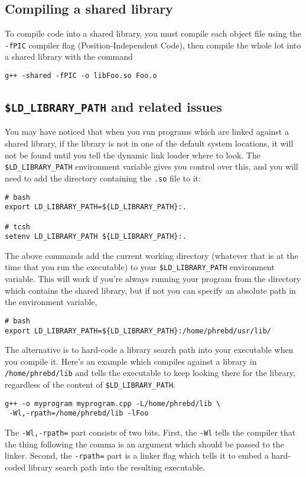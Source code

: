 \documentclass[a4paper]{scrartcl}
\begin{document}
\subsection{Compiling a shared library}
To compile code into a shared library, you must compile each object file using the \verb|-fPIC| compiler flag (Position-Independent Code), then compile the whole lot into a shared library with the command
\begin{verbatim}
g++ -shared -fPIC -o libFoo.so Foo.o
\end{verbatim}

\subsection{\texttt{\$LD\_LIBRARY\_PATH} and related issues}
You may have noticed that when you run programs which are linked against a shared library, if the library is not in one of the default system locations, it will not be found until you tell the dynamic link loader where to look. The \verb|$LD_LIBRARY_PATH| environment variable gives you control over this, and you will need to add the directory containing the \verb|.so| file to it:
\begin{verbatim}
# bash
export LD_LIBRARY_PATH=${LD_LIBRARY_PATH}:.

# tcsh
setenv LD_LIBRARY_PATH ${LD_LIBRARY_PATH}:.
\end{verbatim}

The above commands add the current working directory (whatever that is at the time that you run the executable) to your \verb|$LD_LIBRARY_PATH| environment variable. This will work if you're always running your program from the directory which contains the shared library, but if not you can specify an absolute path in the environment variable,
\begin{verbatim}
# bash
export LD_LIBRARY_PATH=${LD_LIBRARY_PATH}:/home/phrebd/usr/lib/
\end{verbatim}

The alternative is to hard-code a library search path into your executable when you compile it. Here's an example which compiles against a library in \verb|/home/phrebd/lib| and tells the executable to keep looking there for the library, regardless of the content of \verb|$LD_LIBRARY_PATH|.
\begin{verbatim}
g++ -o myprogram myprogram.cpp -L/home/phrebd/lib \
 -Wl,-rpath=/home/phrebd/lib -lFoo
\end{verbatim}

The \verb|-Wl,-rpath=| part consists of two bits. First, the \verb|-Wl| tells the compiler that the thing following the comma is an argument which should be passed to the linker. Second, the \verb|-rpath=| part is a linker flag which tells it to embed a hard-coded library search path into the resulting executable.
\end{document}
